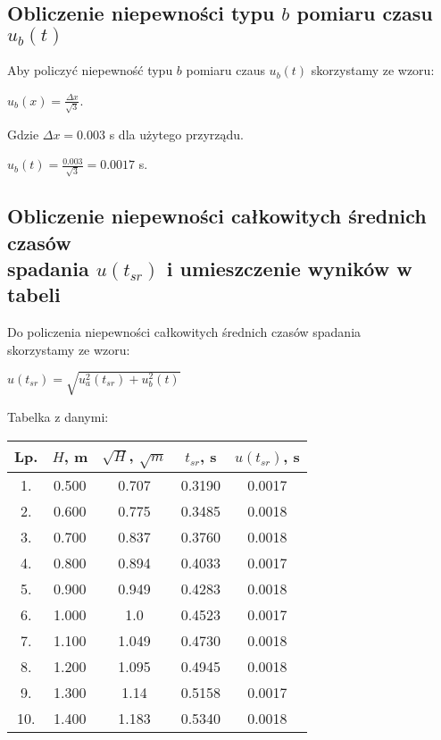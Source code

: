 \documentclass[12pt]{article}
\begin{document}
\subsection*{Obliczenie niepewności typu $b$ pomiaru czasu $u_b(t)$}
Aby policzyć niepewność typu $b$ pomiaru czaus $u_b(t)$ skorzystamy ze wzoru:
\begin{center}
    $u_b(x) = \frac{\Delta x}{\sqrt{3}}$.
\end{center}
Gdzie $\Delta x = 0.003$ s dla użytego przyrządu.
\begin{center}
    $u_b(t) = \frac{0.003}{\sqrt{3}} = 0.0017$ s.
\end{center}

\subsection*{Obliczenie niepewności całkowitych średnich czasów  \\
    spadania $u(t_{sr})$ i umieszczenie wyników w tabeli}

Do policzenia niepewności całkowitych średnich czasów spadania \\
skorzystamy ze wzoru:
\begin{center}
    $u(t_{sr}) = \sqrt{u_a^2(t_{sr}) + u_b^2(t)}$
\end{center}
Tabelka z danymi:
\begin{center}
    \begin{tabular} { | c | c | c | c | c | }
        \hline
        Lp. & $H$, m & $\sqrt{H}$, $\sqrt{m}$ & $t_{sr}$, s & $u(t_{sr})$, s \\
        \hline
        1.  & 0.500  & 0.707                  & 0.3190     & 0.0017         \\
        \hline
        2.  & 0.600  & 0.775                  & 0.3485      & 0.0018         \\
        \hline
        3.  & 0.700  & 0.837                  & 0.3760      & 0.0018         \\
        \hline
        4.  & 0.800  & 0.894                  & 0.4033      & 0.0017         \\
        \hline
        5.  & 0.900  & 0.949                  & 0.4283      & 0.0018         \\
        \hline
        6.  & 1.000  & 1.0                  & 0.4523      & 0.0017         \\
        \hline
        7.  & 1.100  & 1.049                  & 0.4730      & 0.0018         \\
        \hline
        8.  & 1.200  & 1.095                  & 0.4945      & 0.0018         \\
        \hline
        9.  & 1.300  & 1.14                  & 0.5158      & 0.0017         \\
        \hline
        10. & 1.400  & 1.183                  & 0.5340      & 0.0018         \\
        \hline
    \end{tabular}
\end{center}
\end{document}
